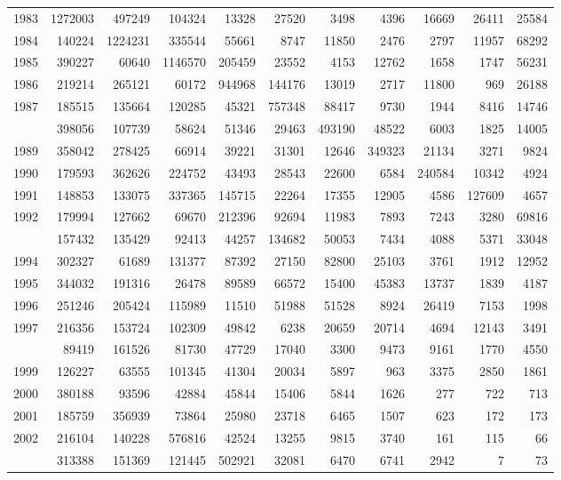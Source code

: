\documentclass[
]{article}
\begin{document}
\begin{longtable}[t]{lrrrrrrrrrr}
1983 & 1272003 & 497249 & 104324 & 13328 & 27520 & 3498 & 4396 & 16669 & 26411 & 25584\\
1984 & 140224 & 1224231 & 335544 & 55661 & 8747 & 11850 & 2476 & 2797 & 11957 & 68292\\
1985 & 390227 & 60640 & 1146570 & 205459 & 23552 & 4153 & 12762 & 1658 & 1747 & 56231\\
1986 & 219214 & 265121 & 60172 & 944968 & 144176 & 13019 & 2717 & 11800 & 969 & 26188\\
1987 & 185515 & 135664 & 120285 & 45321 & 757348 & 88417 & 9730 & 1944 & 8416 & 14746\\
\addlinespace
1988 & 398056 & 107739 & 58624 & 51346 & 29463 & 493190 & 48522 & 6003 & 1825 & 14005\\
1989 & 358042 & 278425 & 66914 & 39221 & 31301 & 12646 & 349323 & 21134 & 3271 & 9824\\
1990 & 179593 & 362626 & 224752 & 43493 & 28543 & 22600 & 6584 & 240584 & 10342 & 4924\\
1991 & 148853 & 133075 & 337365 & 145715 & 22264 & 17355 & 12905 & 4586 & 127609 & 4657\\
1992 & 179994 & 127662 & 69670 & 212396 & 92694 & 11983 & 7893 & 7243 & 3280 & 69816\\
\addlinespace
1993 & 157432 & 135429 & 92413 & 44257 & 134682 & 50053 & 7434 & 4088 & 5371 & 33048\\
1994 & 302327 & 61689 & 131377 & 87392 & 27150 & 82800 & 25103 & 3761 & 1912 & 12952\\
1995 & 344032 & 191316 & 26478 & 89589 & 66572 & 15400 & 45383 & 13737 & 1839 & 4187\\
1996 & 251246 & 205424 & 115989 & 11510 & 51988 & 51528 & 8924 & 26419 & 7153 & 1998\\
1997 & 216356 & 153724 & 102309 & 49842 & 6238 & 20659 & 20714 & 4694 & 12143 & 3491\\
\addlinespace
1998 & 89419 & 161526 & 81730 & 47729 & 17040 & 3300 & 9473 & 9161 & 1770 & 4550\\
1999 & 126227 & 63555 & 101345 & 41304 & 20034 & 5897 & 963 & 3375 & 2850 & 1861\\
2000 & 380188 & 93596 & 42884 & 45844 & 15406 & 5844 & 1626 & 277 & 722 & 713\\
2001 & 185759 & 356939 & 73864 & 25980 & 23718 & 6465 & 1507 & 623 & 172 & 173\\
2002 & 216104 & 140228 & 576816 & 42524 & 13255 & 9815 & 3740 & 161 & 115 & 66\\
\addlinespace
2003 & 313388 & 151369 & 121445 & 502921 & 32081 & 6470 & 6741 & 2942 & 7 & 73\\

\end{longtable}
\end{document}
